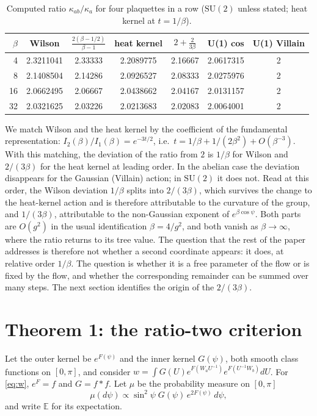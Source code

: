 \documentclass[11pt,a4paper]{article}
\theoremstyle{definition}
\theoremstyle{remark}
\newcommand{\E}{\mathbb{E}}
\newcommand{\SU}{\mathrm{SU}(2)}
\begin{document}
\begin{table}[h]
\centering\small
\caption{Computed ratio $\kappa_{ab}/\kappa_a$ for four plaquettes in a row ($\SU$ unless stated; heat kernel at $t=1/\beta$).}\label{tab:ratio}
\begin{tabular}{@{}rcccccc@{}}
\toprule
$\beta$ & Wilson & $\frac{2(\beta-1/2)}{\beta-1}$ & heat kernel & $2+\frac{2}{3\beta}$ & U(1) cos & U(1) Villain\\ \midrule
4 & 2.3211041 & 2.33333 & 2.2089775 & 2.16667 & 2.0617315 & 2\\
8 & 2.1408504 & 2.14286 & 2.0926527 & 2.08333 & 2.0275976 & 2\\
16 & 2.0662495 & 2.06667 & 2.0438662 & 2.04167 & 2.0131157 & 2\\
32 & 2.0321625 & 2.03226 & 2.0213683 & 2.02083 & 2.0064001 & 2\\
\bottomrule
\end{tabular}
\end{table}

We match Wilson and the heat kernel by the coefficient of the fundamental representation: $I_2(\beta)/I_1(\beta)=e^{-3t/2}$, i.e.\ $t=1/\beta+1/(2\beta^2)+O(\beta^{-3})$.
With this matching, the deviation of the ratio from $2$ is $1/\beta$ for Wilson and $2/(3\beta)$ for the heat kernel at leading order.
In the abelian case the deviation disappears for the Gaussian (Villain) action; in $\SU$ it does not.
Read at this order, the Wilson deviation $1/\beta$ splits into $2/(3\beta)$, which survives the change to the heat-kernel action and is therefore attributable to the curvature of the group, and $1/(3\beta)$, attributable to the non-Gaussian exponent of $e^{\beta\cos\psi}$.
Both parts are $O(g^2)$ in the usual identification $\beta=4/g^2$, and both vanish as $\beta\to\infty$, where the ratio returns to its tree value.
The question that the rest of the paper addresses is therefore not whether a second coordinate appears: it does, at relative order $1/\beta$.
The question is whether it is a free parameter of the flow or is fixed by the flow, and whether the corresponding remainder can be summed over many steps.
The next section identifies the origin of the $2/(3\beta)$.

\section{Theorem 1: the ratio-two criterion}\label{sec:thm1}

Let the outer kernel be $e^{F(\psi)}$ and the inner kernel $G(\psi)$, both smooth class functions on $[0,\pi]$, and consider $w=\int G(U)e^{F(W_aU^{-1})}e^{F(U^{-1}W_b)}dU$.
For \eqref{eq:w}, $e^F=f$ and $G=f*f$.
Let $\mu$ be the probability measure on $[0,\pi]$
\[
\mu(d\psi)\propto\sin^2\psi\;G(\psi)\,e^{2F(\psi)}\,d\psi,
\]
and write $\E$ for its expectation.
\end{document}
